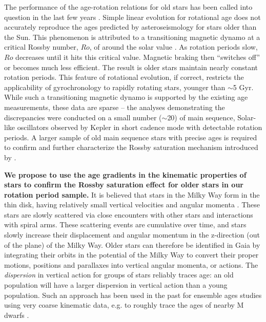 \documentclass[12pt]{article}
\newcommand{\eg}{{\it e.g.}}
\begin{document}
The performance of the age-rotation relations for old
stars has been called into question in the last few years
\citep{angus2015,van-saders2016, Metcalfe2016}.
Simple linear evolution for rotational age does not accurately reproduce the ages
predicted by asteroseismology for stars older than the Sun.
This phenomenon is attributed to a transitioning magnetic dynamo at a critical
Rossby number, $Ro$, of around the solar value \citep{van-saders2016}.
As rotation periods slow, $Ro$ decreases until it hits this critical value. Magnetic braking then ``switches off'' or becomes much less efficient. The result is older stars maintain nearly constant rotation periods. This feature of rotational evolution, if correct, restricts the applicability
of gyrochronology to rapidly rotating stars, younger than $\sim$5 Gyr.
While such a transitioning magnetic dynamo is supported by the existing age
measurements,
these data are sparse -- the analyses demonstrating the discrepancies were
conducted on a small number ($\sim$20) of main sequence, Solar-like oscillators observed
by Kepler in short cadence mode with detectable rotation periods.
A larger sample of old main sequence stars with precise ages is required to
confirm and further characterize the Rossby saturation mechanism introduced by
\citep{van-saders2016}.

{\bf We propose to use the age gradients in the kinematic properties of stars to
confirm the Rossby saturation effect for older stars in our rotation period sample.}
It is believed that stars in the Milky Way form in the thin disk, having relatively small vertical velocities and angular momenta
\citep[\eg][]{carlberg1985, edvardsson1993, freeman2002, bensby2004,
holmberg2007}.
These stars are slowly scattered via close encounters with other stars and
interactions with spiral arms.
These scattering events are cumulative over time, and stars slowly
increase their displacement and angular momentum in the z-direction (out of the
plane) of the Milky Way.
Older stars can therefore be identified in Gaia by integrating their orbits in the
potential of the Milky Way to convert their proper motions, positions and
parallaxes into vertical angular momenta, or actions.
The {\it dispersion} in vertical action for groups of stars reliably traces
age: an old population will have a larger dispersion in vertical action than a
young population. Such an approach has been used in the past for ensemble ages studies using very coarse kinematic data, e.g. to roughly trace the ages of nearby M dwarfs \citep{bochanski_gal}.
\end{document}
